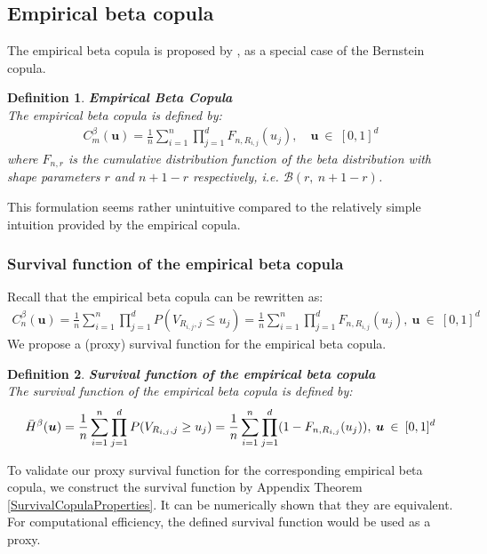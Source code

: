 \documentclass[12pt]{report}
\newtheorem{definition}{Definition}[subsection]
\newcommand{\1}{\mathbf{1}}
\begin{document}
\begin{flushleft}
\newpage
\subsection{Empirical beta copula}
\vspace{0.5cm}

The empirical beta copula is proposed by \cite{SegersEBC}, as a special case of the Bernstein copula.

\begin{definition}\label{EBCDef}
\textit{\normalfont\parencite{SegersEBC}} \:
\textbf{Empirical Beta Copula} \\
The empirical beta copula is defined by:
\begin{align*}
C^{\beta}_{m}(\boldsymbol{u}) = \frac{1}{n} \sum\limits_{i = 1}^{n} \prod\limits_{j = 1}^{d} F_{n,R_{i,j}}(u_{j}), \quad \boldsymbol{u} \: \in \: [0,1]^{d}
\end{align*}
where $F_{n,r}$ is the cumulative distribution function of the beta distribution with shape parameters $r$ and $n + 1 - r$ respectively, i.e. $\mathcal{B}(r, \:n + 1 - r)$.
\end{definition}

This formulation seems rather unintuitive compared to the relatively simple intuition provided by the empirical copula. \\

\subsubsection{Survival function of the empirical beta copula}

Recall that the empirical beta copula can be rewritten as:
\begin{align*}
C^{\beta}_{n}(\boldsymbol{u}) = \frac{1}{n} \sum\limits_{i = 1}^{n} \prod\limits_{j = 1}^{d} P(V_{R_{i,j},j} \le u_{j}) = \frac{1}{n} \sum\limits_{i = 1}^{n} \prod\limits_{j = 1}^{d} F_{n,R_{i,j}}(u_{j}), \: \boldsymbol{u} \: \in \: [0,1]^{d}
\end{align*}
We propose a (proxy) survival function for the empirical beta copula.
\begin{definition}\label{SurvivalEBC}
\textbf{Survival function of the empirical beta copula} \\
The survival function of the empirical beta copula is defined by:
\begin{align*}
\Bar{H}^{\beta}(\boldsymbol{u}) = \frac{1}{n} \sum\limits_{i = 1}^{n} \prod\limits_{j = 1}^{d} P(V_{R_{i,j},j} \ge u_{j}) = \frac{1}{n} \sum\limits_{i = 1}^{n} \prod\limits_{j = 1}^{d} (1 - F_{n,R_{i,j}}(u_{j})), \: \boldsymbol{u} \: \in \: [0,1]^{d}
\end{align*}
\end{definition}
To validate our proxy survival function for the corresponding empirical beta copula, we construct the survival function by Appendix Theorem \ref{SurvivalCopulaProperties}. It can be numerically shown that they are equivalent. For computational efficiency, the defined survival function would be used as a proxy.


\end{flushleft}
\end{document}
